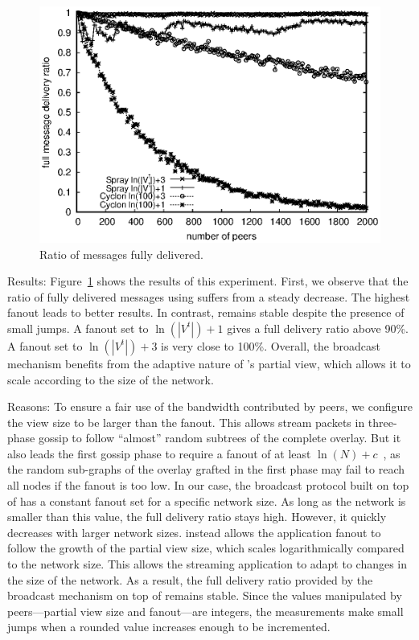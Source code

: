 \begin{asparadesc}
\begin{figure}
  \begin{center}
    \includegraphics[width=\SCALE\columnwidth]{img/hardrate.eps}
    \caption{\label{fig:hardrate}Ratio of messages fully delivered.}
  \end{center}
\end{figure}

\item [Results:] Figure~\ref{fig:hardrate} shows the results of this
  experiment. First, we observe that the ratio of fully delivered
  messages using \CYCLON suffers from a steady decrease. The highest
  fanout leads to better results. In contrast, \SPRAY remains stable
  despite the presence of small jumps. A fanout set to $\ln(|V^t|)+1$
  gives a full delivery ratio above 90\%. A fanout set to
  $\ln(|V^t|)+3$ is very close to 100\%. Overall, the broadcast
  mechanism benefits from the adaptive nature of \SPRAY's partial
  view, which allows it to scale according to the size of the network.
\item [Reasons:] To ensure a fair use of the bandwidth contributed by
  peers, we configure the view size to be larger than the fanout. This
  allows stream packets in three-phase gossip to follow ``almost''
  random subtrees of the complete overlay. But it also leads the first
  gossip phase to require a fanout of at least $\ln(N)+c$~\cite{PRD},
  as the random sub-graphs of the overlay grafted in the first phase
  may fail to reach all nodes if the fanout is too low. In our case,
  the broadcast protocol built on top of \CYCLON has a constant fanout
  set for a specific network size. As long as the network is smaller
  than this value, the full delivery ratio stays high. However, it
  quickly decreases with larger network sizes.  \SPRAY instead allows
  the application fanout to follow the growth of the partial view
  size, which scales logarithmically compared to the network
  size. This allows the streaming application to adapt to changes in
  the size of the network. As a result, the full delivery ratio
  provided by the broadcast mechanism on top of \SPRAY remains
  stable. Since the values manipulated by peers---partial view size
  and fanout---are integers, the measurements make small jumps when a
  rounded value increases enough to be incremented.
\end{asparadesc}

